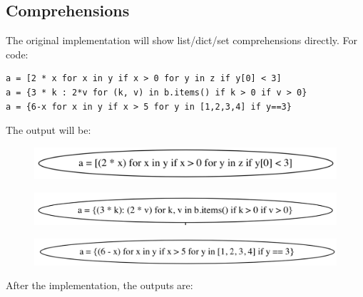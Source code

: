 \documentclass[11pt]{article}
\begin{document}
\subsection{Comprehensions}
The original implementation will show list/dict/set comprehensions directly. For code:
\begin{lstlisting}
a = [2 * x for x in y if x > 0 for y in z if y[0] < 3]
a = {3 * k : 2*v for (k, v) in b.items() if k > 0 if v > 0}
a = {6-x for x in y if x > 5 for y in [1,2,3,4] if y==3}
\end{lstlisting}
The output will be:
\begin{figure}[H]
  \centering
  \includegraphics[width=.76\textwidth]{img/listcomp_before.png}
\end{figure}
\vspace*{-.85cm}
\begin{figure}[H]
  \centering
  \includegraphics[width=.8\textwidth]{img/dictcomp_before.png}
\end{figure}
\vspace*{-.7cm}
\begin{figure}[H]
  \centering
  \includegraphics[width=.8\textwidth]{img/setcomp_before.png}
\end{figure}
\noindent
After the implementation, the outputs are:
\end{document}
